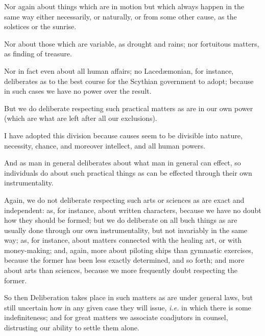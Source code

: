 Nor again about things which are in motion but which always happen in the same
way either necessarily, or naturally, or from some other cause, as the
solstices or the sunrise.

Nor about those which are variable, as drought and rains; nor fortuitous
matters, as finding of treasure.

Nor in fact even about all human affairs; no Lacedæmonian, for instance,
deliberates as to the best course for the Scythian government to adopt; because
in such cases we have no power over the result.

But we do deliberate respecting such practical matters as are in our own power
(which are what are left after all our exclusions).

I have adopted this division because causes seem to be divisible into nature,
necessity, chance, and moreover intellect, and all human powers.

And as man in general deliberates about what man in general can effect, so
individuals do about such practical things as can be effected through their own
instrumentality.

Again, we do not deliberate respecting such arts or sciences as are exact and
independent: as, for instance, about written characters, because we have no
doubt how they should be formed; but we do deliberate on all buch things as are
usually done through our own instrumentality, but not invariably in the same
way; as, for instance, about matters connected with the healing art, or with
money-making; and, again, more about piloting ships than gymnastic exercises,
because the former has been less exactly determined, and so forth; and more
about arts than sciences, because we more frequently doubt respecting the
former.

So then Deliberation takes place in such matters as are under general laws, but
still uncertain how in any given case they will issue, \emph{i.e.} in which
there is some indefiniteness; and for great matters we associate coadjutors in
counsel, distrusting our ability to settle them alone.

